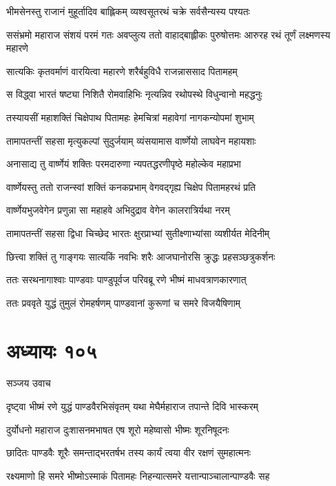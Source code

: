 \twolineshloka
{भीमसेनस्तु राजानं मुहूर्तादिव बाह्लिकम्}
{व्यश्वसूतरथं चक्रे सर्वसैन्यस्य पश्यतः}


ससंभ्रमो महाराज संशयं परमं गतः
\twolineshloka
{अवप्लुत्य ततो वाहाद्बाह्लीकः पुरुषोत्तमः}
{आरुरह रथं तूर्णं लक्ष्मणस्य महारणे}


\twolineshloka
{सात्यकिः कृतवर्माणं वारयित्वा महारणे}
{शरैर्बहुविधै राजन्नाससाद पितामहम्}


\twolineshloka
{स विद्ध्वा भारतं षष्ट्या निशितै रोमवाहिभिः}
{नृत्यन्निव रथोपस्थे विधुन्वानो महद्धनुः}


\twolineshloka
{तस्यायसीं महाशक्तिं चिक्षेपाथ पितामहः}
{हेमचित्रां महावेगां नागकन्योपमां शुभाम्}


\twolineshloka
{तामापतन्तीं सहसा मृत्युकल्पां सुदुर्जयाम्}
{व्यंसयामास वार्ष्णेयो लाघवेन महायशाः}


\twolineshloka
{अनासाद्य तु वार्ष्णेयं शक्तिः परमदारुणा}
{न्यपतद्धरणीपृष्ठे महोल्केव महाप्रभा}


\twolineshloka
{वार्ष्णेयस्तु ततो राजन्स्वां शक्तिं कनकप्रभाम्}
{वेगवद्गृह्य चिक्षेप पितामहरथं प्रति}


\twolineshloka
{वार्ष्णेयभुजवेगेन प्रणुन्ना सा महाहवे}
{अभिदुद्राव वेगेन कालरात्रिर्यथा नरम्}


\twolineshloka
{तामापतन्तीं सहसा द्विधा चिच्छेद भारतः}
{क्षुरप्राभ्यां सुतीक्ष्णाभ्यांसा व्यशीर्यत मेदिनीम्}


\twolineshloka
{छित्त्वा शक्तिं तु गाङ्गयः सात्यकिं नवभिः शरैः}
{आजघानोरसि क्रुद्धः प्रहसञ्छत्रुकर्शनः}


\twolineshloka
{ततः सरथनागाश्वाः पाण्डवाः पाण्डुपूर्वज}
{परिवब्रू रणे भीष्मं माधवत्राणकारणात्}


\twolineshloka
{ततः प्रववृते युद्धं तुमुलं रोमहर्षणम्}
{पाण्डवानां कुरूणां च समरे विजयैषिणाम्}


\chapter{अध्यायः १०५}
\twolineshloka
{सञ्जय उवाच}
{}


\twolineshloka
{दृष्ट्वा भीष्मं रणे युद्धं पाण्डवैरभिसंवृतम्}
{यथा मेघैर्महाराज तपान्ते दिवि भास्करम्}


\twolineshloka
{दुर्योधनो महाराज दुःशासनमभाषत}
{एष शूरो महेष्वासो भीष्मः शूरनिषूदनः}


\twolineshloka
{छादितः पाण्डवैः शूरैः समन्ताद्भरतर्षभ}
{तस्य कार्यं त्वया वीर रक्षणं सुमहात्मनः}


\twolineshloka
{रक्ष्यमाणो हि समरे भीष्मोऽस्माकं पितामहः}
{निहन्यात्समरे यत्तान्पाञ्चालान्पाण्डवैः सह}


